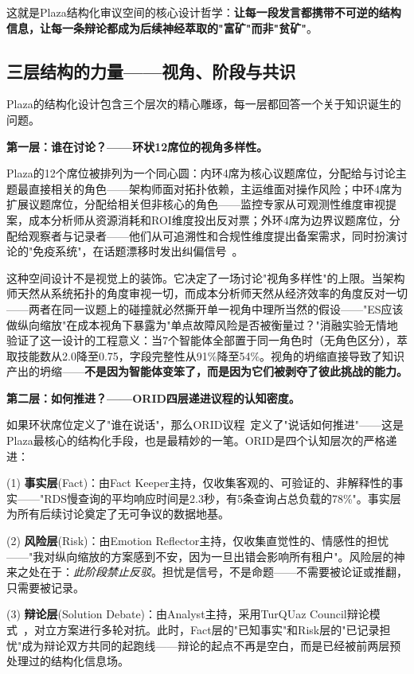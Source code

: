 \documentclass[twocolumn,10.5pt]{ctexart}
\begin{document}
这就是Plaza结构化审议空间的核心设计哲学：\textbf{让每一段发言都携带不可逆的结构信息，让每一条辩论都成为后续神经萃取的"富矿"而非"贫矿"}。

\subsection{三层结构的力量——视角、阶段与共识}

Plaza的结构化设计包含三个层次的精心雕琢，每一层都回答一个关于知识诞生的问题。

\textbf{第一层：谁在讨论？——环状12席位的视角多样性。}

Plaza的12个席位被排列为一个同心圆：内环4席为核心议题席位，分配给与讨论主题最直接相关的角色——架构师面对拓扑依赖，主运维面对操作风险；中环4席为扩展议题席位，分配给相关但非核心的角色——监控专家从可观测性维度审视提案，成本分析师从资源消耗和ROI维度投出反对票；外环4席为边界议题席位，分配给观察者与记录者——他们从可追溯性和合规性维度提出备案需求，同时扮演讨论的"免疫系统"，在话题漂移时发出纠偏信号~\cite{gungor2025turquaz}。

这种空间设计不是视觉上的装饰。它决定了一场讨论"视角多样性"的上限。当架构师天然从系统拓扑的角度审视一切，而成本分析师天然从经济效率的角度反对一切——两者在同一议题上的碰撞就必然撕开单一视角中理所当然的假设——"ES应该做纵向缩放"在成本视角下暴露为"单点故障风险是否被衡量过？"消融实验无情地验证了这一设计的工程意义：当7个智能体全部置于同一角色时（无角色区分），萃取技能数从2.0降至0.75，字段完整性从91\%降至54\%。视角的坍缩直接导致了知识产出的坍缩——\textbf{不是因为智能体变笨了，而是因为它们被剥夺了彼此挑战的能力。}

\textbf{第二层：如何推进？——ORID四层递进议程的认知密度。}

如果环状席位定义了"谁在说话"，那么ORID议程~\cite{kaner2014facilitator}定义了"说话如何推进"——这是Plaza最核心的结构化手段，也是最精妙的一笔。ORID是四个认知层次的严格递进：

(1) \textbf{事实层}(Fact)：由Fact Keeper主持，仅收集客观的、可验证的、非解释性的事实——"RDS慢查询的平均响应时间是2.3秒，有5条查询占总负载的78\%"。事实层为所有后续讨论奠定了无可争议的数据地基。

(2) \textbf{风险层}(Risk)：由Emotion Reflector主持，仅收集直觉性的、情感性的担忧——"我对纵向缩放的方案感到不安，因为一旦出错会影响所有租户"。风险层的神来之处在于：\emph{此阶段禁止反驳}。担忧是信号，不是命题——不需要被论证或推翻，只需要被记录。

(3) \textbf{辩论层}(Solution Debate)：由Analyst主持，采用TurQUaz Council辩论模式~\cite{gungor2025turquaz}，对立方案进行多轮对抗。此时，Fact层的"已知事实"和Risk层的"已记录担忧"成为辩论双方共同的起跑线——辩论的起点不再是空白，而是已经被前两层预处理过的结构化信息场。
\end{document}
